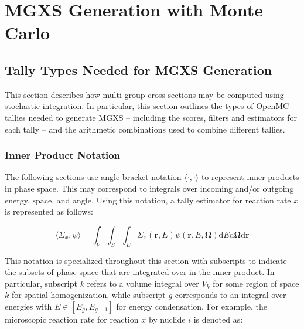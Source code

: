 \section{MGXS Generation with Monte Carlo}
\label{sec:mgxs-mc}


\subsection{Tally Types Needed for MGXS Generation}
\label{subsec:tally-types}

This section describes how multi-group cross sections may be computed using stochastic integration. In particular, this section outlines the types of OpenMC tallies needed to generate MGXS -- including the scores, filters and estimators for each tally -- and the arithmetic combinations used to combine different tallies.

\subsubsection{Inner Product Notation}
\label{subsubsec:tally-types-notation}

The following sections use angle bracket notation $\langle \cdot , \cdot \rangle$ to represent inner products in phase space. This may correspond to integrals over incoming and/or outgoing energy, space, and angle. Using this notation, a tally estimator for reaction rate $x$ is represented as follows: 

\begin{equation}
\label{eqn:inner-prod}
\langle \Sigma_x, \psi \rangle = \int_{V} \int_{S} \int_{E} \Sigma_{x}(\mathbf{r},E)\psi(\mathbf{r},E,\mathbf{\Omega}) \mathrm{d}E\mathrm{d}\mathbf{\Omega}\mathrm{d}\mathbf{r}
\end{equation}

\noindent This notation is specialized throughout this section with subscripts to indicate the subsets of phase space that are integrated over in the inner product. In particular, subscript $k$ refers to a volume integral over $V_{k}$ for some region of space $k$ for spatial homogenization, while subscript $g$ corresponds to an integral over energies with $E \in [E_{g}, E_{g-1}]$ for energy condensation. For example, the microscopic reaction rate for reaction $x$ by nuclide $i$ is denoted as:

